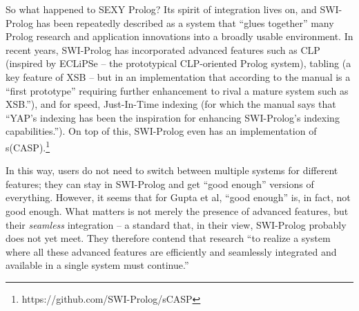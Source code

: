 So what happened to SEXY Prolog? Its spirit of integration lives on, and SWI-Prolog has been repeatedly described as a system that ``glues together'' many Prolog research and application innovations into a broadly usable environment. In recent years, SWI-Prolog has incorporated advanced features such as CLP (inspired by ECLiPSe -- the prototypical CLP-oriented Prolog system), tabling (a key feature of XSB -- but in an implementation that according to the manual is a ``first prototype'' requiring further enhancement to rival a mature system such as XSB.''), and for speed, Just-In-Time indexing (for which the manual says  that ``YAP's indexing has been the inspiration for enhancing SWI-Prolog's indexing capabilities.''). On top of this, SWI-Prolog even has an implementation of s(CASP).\footnote{https://github.com/SWI-Prolog/sCASP}

In this way, users do not need to switch between multiple systems for different features; they can stay in SWI-Prolog and get ``good enough'' versions of everything.
%
%
However, it seems that for Gupta et al, ``good enough'' is, in fact, not good enough. 
What matters is not merely the presence of advanced features, but their \textit{seamless} integration -- a standard that, in their view, SWI-Prolog probably does not yet meet. They therefore contend that research ``to realize a system where all these advanced features are efficiently and seamlessly integrated and available in a single system must continue.'' 

